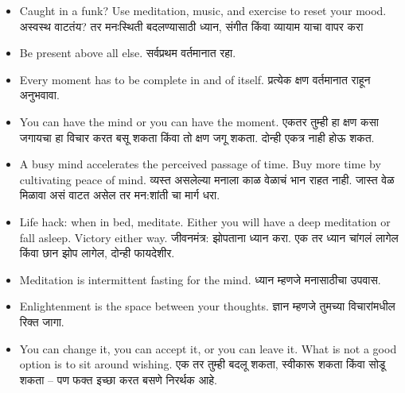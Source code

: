 \begin{frame}[fragile]
\begin{itemize}
  \item Caught in a funk? Use meditation, music, and exercise to reset your mood. अस्वस्थ वाटतंय? तर मनःस्थिती बदलण्यासाठी ध्यान, संगीत किंवा व्यायाम याचा वापर करा

  \item Be present above all else. सर्वप्रथम वर्तमानात रहा. 

  \item Every moment has to be complete in and of itself. प्रत्येक क्षण वर्तमानात राहून अनुभवावा. 

  \item You can have the mind or you can have the moment. एकतर तुम्ही हा क्षण कसा जगायचा हा विचार करत बसू शकता किंवा तो क्षण जगू शकता. दोन्ही एकत्र नाही होऊ शकत. 

  \item A busy mind accelerates the perceived passage of time. Buy more time by cultivating peace of mind. व्यस्त असलेल्या मनाला काळ वेळाचं भान राहत नाही. जास्त वेळ मिळावा असं वाटत असेल तर मन:शांती चा मार्ग धरा.  

  \item Life hack: when in bed, meditate. Either you will have a deep meditation or fall asleep. Victory either way. जीवनमंत्र: झोपताना ध्यान करा. एक तर ध्यान चांगलं लागेल किंवा छान झोप लागेल, दोन्ही फायदेशीर. 

  \item Meditation is intermittent fasting for the mind. ध्यान म्हणजे मनासाठीचा उपवास. 

  \item Enlightenment is the space between your thoughts. ज्ञान म्हणजे तुमच्या विचारांमधील रिक्त जागा.

  \item You can change it, you can accept it, or you can leave it. What is not a good option is to sit around wishing. एक तर तुम्ही बदलू शकता, स्वीकारू शकता किंवा सोडू शकता – पण फक्त इच्छा करत बसणे निरर्थक आहे. 
\end{itemize}
\end{frame}

